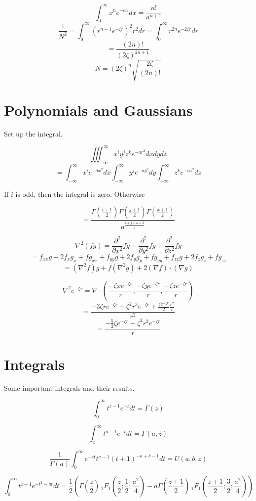 \documentclass[12pt]{article}
\begin{document}
$$\int_0^\infty x^n e^{-ax} dx = \frac{n!}{a^{n + 1}}$$
$$\frac{1}{N^2} = \int_0^\infty \left(r^{n - 1} e^{-\zeta r}\right)^2 r^2 dr = \int_0^\infty r^{2n} e^{-2\zeta r} dr$$
$$ = \frac{(2n)!}{(2\zeta)^{2n + 1}}$$
$$N = (2\zeta)^n \sqrt{\frac{2\zeta}{(2n)!}}$$

\section*{Polynomials and Gaussians}

Set up the integral.

$$\iiint_{-\infty}^\infty x^i y^j z^k e^{-ar^2} dxdydz$$
$$= \int_{-\infty}^\infty x^ie^{-ax^2} dx \int_{-\infty}^\infty y^j e^{-ay^2} dy \int_{-\infty}^\infty z^k e^{-az^2} dz$$

If $i$ is odd, then the integral is zero. Otherwise

$$= \frac{\Gamma\left(\frac{i + 1}{2}\right)\Gamma\left(\frac{j + 1}{2}\right)\Gamma\left(\frac{k + 1}{2}\right)}{a^{\frac{i + j + k + 3}{2}}}$$

$$\nabla^2(fg) = \frac{\partial^2}{\partial x^2} fg + \frac{\partial^2}{\partial y^2} fg + \frac{\partial^2}{\partial z^2} fg$$
$$ = f_{xx}g + 2f_xg_x + fg_{xx} + f_{yy}g + 2f_yg_y + fg_{yy} + f_{zz}g + 2f_zg_z + fg_{zz}$$
$$ = \left(\nabla^2 f\right)g + f\left(\nabla^2 g\right) + 2\left(\nabla f\right)\cdot\left(\nabla g\right)$$

$$\nabla^2 e^{-\zeta r} = \nabla\cdot \left(\frac{-\zeta x e^{-\zeta r}}{r}, \frac{-\zeta y e^{-\zeta r}}{r}, \frac{-\zeta z e^{-\zeta r}}{r}\right)$$
$$= \frac{-3\zeta r e^{-\zeta r} + \zeta^2 r^3 e^{-\zeta r} + \frac{\zeta e^{-\zeta r}}{2} \frac{r^2}{r}}{r^2}$$
$$ = \frac{-\frac{5}{2}\zeta e^{-\zeta r} + \zeta^2 r^2 e^{-\zeta r}}{r}$$

\section*{Integrals}
Some important integrals and their results.

$$\int_0^\infty t^{z-1}e^{-t} dt = \Gamma(z)$$

$$\int_z^\infty t^{a-1} e^{-t} dt = \Gamma(a, z)$$

$$\frac{1}{\Gamma(a)}\int_0^\infty e^{-zt}t^{a - 1}(t + 1)^{-a + b - 1} dt = U(a, b, z)$$

$$\int_0^\infty t^{z - 1} e^{-t^2-at} dt = \frac{1}{2}\left(\Gamma\left(\frac{z}{2}\right)\, _1F_1\left(\frac{z}{2}; \frac{1}{2}; \frac{a^2}{4}\right) - a\Gamma\left(\frac{z + 1}{2}\right)\,_1F_1\left(\frac{z + 1}{2}; \frac{3}{2}; \frac{a^2}{4}\right)\right)$$
\end{document}
